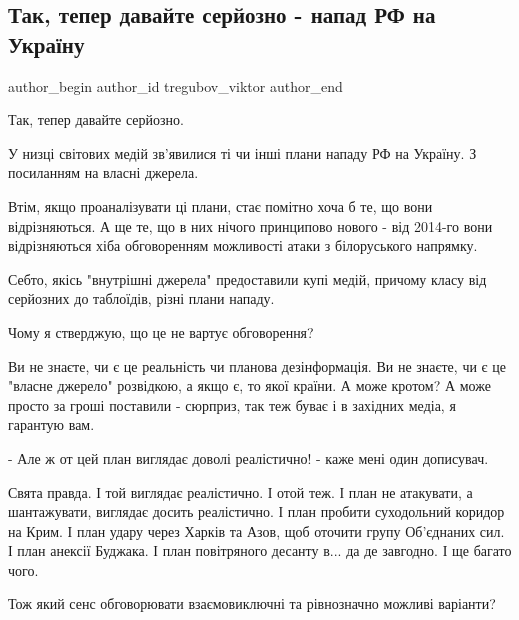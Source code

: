  
 
 
 
 
 
\subsection{Так, тепер давайте серйозно - напад РФ на Україну}
\label{sec:04_12_2021.fb.tregubov_viktor.1.napad_rf_ukraina}
 
\ifcmt
 author_begin
   author_id tregubov_viktor
 author_end
\fi

Так, тепер давайте серйозно.

У низці світових медій зв'явилися ті чи інші плани нападу РФ на Україну. З
посиланням на власні джерела.

Втім, якщо проаналізувати ці плани, стає помітно хоча б те, що вони
відрізняються. А ще те, що в них нічого принципово нового - від 2014-го вони
відрізняються хіба обговоренням можливості атаки з білоруського напрямку.

Себто, якісь "внутрішні джерела" предоставили купі медій, причому класу від
серйозних до таблоїдів, різні плани нападу.

Чому я стверджую, що це не вартує обговорення?

Ви не знаєте, чи є це реальність чи планова дезінформація. Ви не знаєте, чи є
це "власне джерело" розвідкою, а якщо є, то якої країни. А може кротом? А може
просто за гроші поставили - сюрприз, так теж буває і в західних медіа, я
гарантую вам.

- Але ж от цей план виглядає доволі реалістично! - каже мені один дописувач.

Свята правда. І той виглядає реалістично. І отой теж. І план не атакувати, а
шантажувати, виглядає досить реалістично. І план пробити суходольний коридор на
Крим. І план удару через Харків та Азов, щоб оточити групу Об'єднаних сил. І
план анексії Буджака. І план повітряного десанту в... да де завгодно. І ще
багато чого.

Тож який сенс обговорювати взаємовиключні та рівнозначно можливі варіанти?

